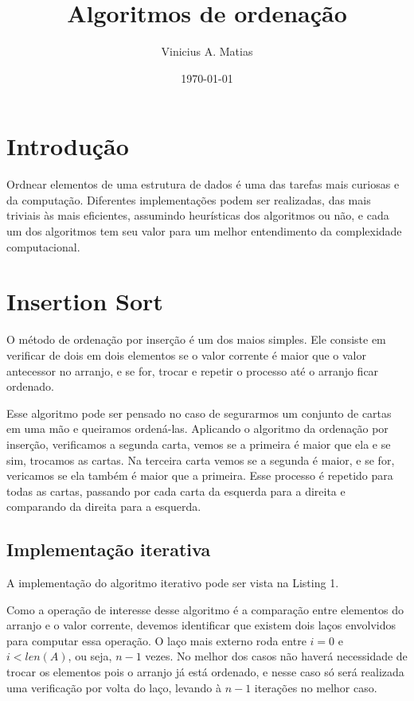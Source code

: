 \documentclass[a4paper, twocolumn]{article}
\title{Algoritmos de ordenação}
\author{Vinicius A. Matias}
\date{\today}
\theoremstyle{definition}
\begin{document}
	\maketitle

	\section{Introdução}
	Ordnear elementos de uma estrutura de dados é uma das tarefas mais curiosas e da computação. Diferentes implementações podem ser realizadas, das mais triviais às mais eficientes, assumindo heurísticas dos algoritmos ou não, e cada um dos algoritmos tem seu valor para um melhor entendimento da complexidade computacional.
	
	\section{Insertion Sort}
	O método de ordenação por inserção é um dos maios simples. Ele consiste em verificar de dois em dois elementos se o valor corrente é maior que o valor antecessor no arranjo, e se for, trocar e repetir o processo até o arranjo ficar ordenado.
	
	Esse algoritmo pode ser pensado no caso de segurarmos um conjunto de cartas em uma mão e queiramos ordená-las. Aplicando o algoritmo da ordenação por inserção, verificamos a segunda carta, vemos se a primeira é maior que ela e se sim, trocamos as cartas. Na terceira carta vemos se a segunda é maior, e se for, vericamos se ela também é maior que a primeira. Esse processo é repetido para todas as cartas, passando por cada carta da esquerda para a direita e comparando da direita para a esquerda.
	
	\subsection{Implementação iterativa}	
	
	A implementação do algoritmo iterativo pode ser vista na Listing 1.
		
	Como a operação de interesse desse algoritmo é a comparação entre elementos do arranjo e o valor corrente, devemos identificar que existem dois laços envolvidos para computar essa operação. O laço mais externo roda entre $i=0$ e $i<len(A)$, ou seja, $n-1$ vezes. No melhor dos casos não haverá necessidade de trocar os elementos pois o arranjo já está ordenado, e nesse caso só será realizada uma verificação por volta do laço, levando à $n-1$ iterações no melhor caso. 
\end{document}
